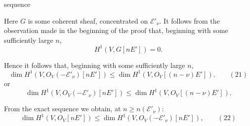 sequence

Here $G$ is some coherent sheaf, concentrated on $\mathcal E'_\nu$. It follows from the observation made in the beginning of the proof that, beginning with some sufficiently large $n$,
\[
H^1(V,G[nE'])=0.
\]

Hence it follows that, beginning with some sufficiently large $n$,
\[
\dim H^1(V,O_V(-\mathcal E'_\nu)[nE'])\le\dim H^1(V,O_V[(n-\nu)E']).\qquad (21)
\]
or
\[
\dim H^1(V,O_V(-\mathcal E'_\nu)[nE'])\le\dim H^1(V,O_V[(n-\nu)E']).
\]

From the exact sequence
we obtain, at $n\ge n(\mathcal E'_\nu)$:
\[
\dim H^1(V,O_V[nE'])\le\dim H^1(V,O_V(-\mathcal E'_\nu)[nE']),\qquad (22)
\]
